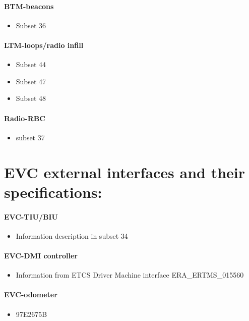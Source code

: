 \documentclass{template/openetcs_article}
\begin{document}
\paragraph{BTM-beacons}
\begin{itemize}
\item Subset 36
\end{itemize}

\paragraph{LTM-loops/radio infill}
\begin{itemize}
\item Subset 44
\item Subset 47
\item Subset 48
\end{itemize}

\paragraph{Radio-RBC}
\begin{itemize}
\item subset 37
\end{itemize}


\section{EVC external interfaces and their specifications:}

\paragraph{EVC-TIU/BIU}
\begin{itemize}
\item Information description in subset 34
\end{itemize}

\paragraph{EVC-DMI controller}
\begin{itemize}
\item Information from ETCS Driver Machine interface ERA\_ERTMS\_015560
\end{itemize}
\paragraph{EVC-odometer}
\begin{itemize}
\item 97E2675B
\end{itemize}
\end{document}
